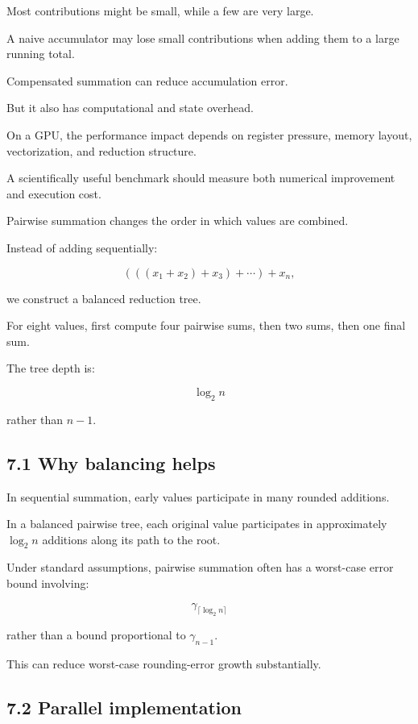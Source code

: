 Most contributions might be small, while a few are very large.

A naive accumulator may lose small contributions when adding them to a large running total.

Compensated summation can reduce accumulation error.

But it also has computational and state overhead.

On a GPU, the performance impact depends on register pressure, memory layout, vectorization, and reduction structure.

A scientifically useful benchmark should measure both numerical improvement and execution cost.

Pairwise summation changes the order in which values are combined.

Instead of adding sequentially:

\[ (((x_1+x_2)+x_3)+\cdots)+x_n, \]

we construct a balanced reduction tree.

For eight values, first compute four pairwise sums, then two sums, then one final sum.

The tree depth is:

\[ \log_2 n \]

rather than \(n-1\).

\subsection{7.1 Why balancing helps}\label{02-foundations-ii-ch028-why-balancing-helps}

In sequential summation, early values participate in many rounded additions.

In a balanced pairwise tree, each original value participates in approximately \(\log_2 n\) additions along its path to the root.

Under standard assumptions, pairwise summation often has a worst-case error bound involving:

\[ \gamma_{\lceil\log_2n\rceil} \]

rather than a bound proportional to \(\gamma_{n-1}\).

This can reduce worst-case rounding-error growth substantially.

\subsection{7.2 Parallel implementation}\label{02-foundations-ii-ch028-parallel-implementation}


